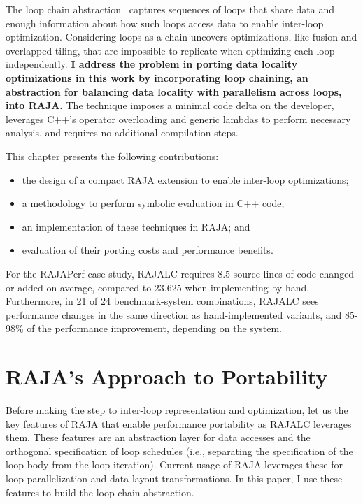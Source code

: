 The loop chain abstraction~\cite{krieger2013} captures sequences of loops that share 
data and enough information about how such loops access 
data to enable inter-loop optimization.
Considering loops as a chain uncovers optimizations, like fusion
and overlapped tiling, that are impossible to replicate when optimizing
each loop independently.
\textbf{I address the problem in porting data locality optimizations in this
work by incorporating loop chaining, an abstraction for balancing data locality
with parallelism across loops, into RAJA.}
The technique imposes a minimal code delta on the developer, leverages C++'s
operator overloading and generic lambdas to perform necessary analysis, and
requires no additional compilation steps.

This chapter presents the following contributions:
\begin{itemize}
\item the design of a compact RAJA extension to enable inter-loop
			optimizations;
\item a methodology to perform symbolic evaluation in C++ code;
\item an implementation of these techniques in RAJA; and
\item evaluation of their porting costs and performance benefits.
\end{itemize}

For the RAJAPerf case study, RAJALC requires 8.5 source lines of code changed or added on average, compared to 23.625 when implementing by hand.
Furthermore, in 21 of 24 benchmark-system combinations, RAJALC sees performance changes in the same direction as hand-implemented variants, and 85-98\% of the performance improvement, depending on the system.

\section{RAJA's Approach to Portability}

Before making the step to inter-loop representation and optimization, let us the key features of RAJA that enable performance portability
as RAJALC leverages them.
These features are an abstraction layer for data accesses and the
orthogonal specification of loop schedules
(i.e., separating the specification of the loop body from the loop iteration).
Current usage of RAJA leverages these for loop parallelization and
data layout transformations.
In this paper, I use these features to build the loop chain abstraction.

